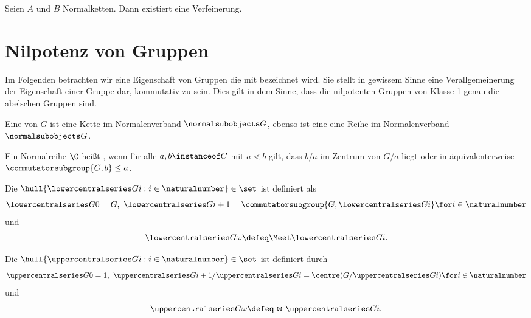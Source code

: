 \begin{theorem}
    Seien $A$ und $B$ Normalketten. Dann existiert eine Verfeinerung.
\end{theorem}

\begin{theorem} 
    
\end{theorem}

\section{Nilpotenz von Gruppen}

Im Folgenden betrachten wir eine Eigenschaft von Gruppen die mit
 bezeichnet wird. Sie stellt in gewissem Sinne
eine Verallgemeinerung der Eigenschaft einer Gruppe dar, kommutativ zu sein. Dies gilt in dem Sinne, dass die nilpotenten Gruppen
von Klasse 1 genau die abelschen Gruppen sind.

\begin{definition}
    Eine  von $G$ ist eine Kette im Normalenverband
    $\normalsubobjects G$, ebenso ist eine  eine Reihe im Normalenverband
    $\normalsubobjects G$.
\end{definition}

\begin{definition}[Zentralkette]
    Ein Normalreihe $\C$ heißt , wenn für alle
    $a,b\instanceof C$ mit $a\lessdot b$ gilt, dass $b/a$ im Zentrum
    von $G/a$ liegt oder in äquivalenterweise $\commutatorsubgroup {G, b} \leq a$.
\end{definition}

\begin{definition}
    Die  $\hull{\lowercentralseries G i:i\in\naturalnumber}\in\set$ ist definiert als
    $$
    \lowercentralseries G 0 = G,\ \lowercentralseries G {i+1} = \commutatorsubgroup {G,\lowercentralseries G i} \for i\in\naturalnumber   
    $$
    und
    $$
    \lowercentralseries G \omega \defeq \Meet \lowercentralseries G i.
    $$
\end{definition}

\begin{definition}
    Die  $\hull{\uppercentralseries G i:i\in\naturalnumber}\in\set$ ist definiert durch
    $$
    \uppercentralseries G 0 = 1,\ \uppercentralseries G {i+1}/\uppercentralseries G i = \centre (G/\uppercentralseries G i) \for
    i\in\naturalnumber
    $$
    und
    $$
    \uppercentralseries G \omega \defeq \Join \uppercentralseries G i.
    $$
\end{definition}

